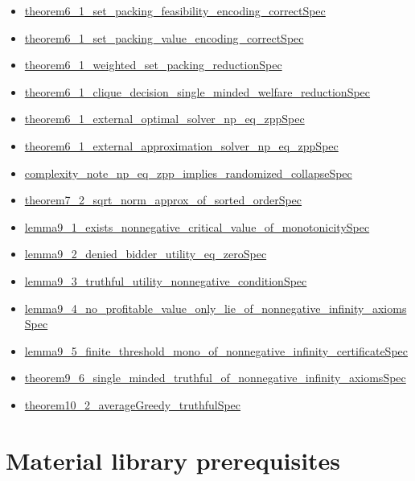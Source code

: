 \documentclass[10pt]{article}
\begin{document}
\begin{itemize}[leftmargin=1.2em]
\begin{itemize}[leftmargin=1.2em]
\item \hyperlink{source-claim-86646cd0d0215b44}{theorem6\_1\_set\_packing\_feasibility\_encoding\_correctSpec}
\item \hyperlink{source-claim-d0d92dc8489e3ec0}{theorem6\_1\_set\_packing\_value\_encoding\_correctSpec}
\item \hyperlink{source-claim-ff0c3f9034b08961}{theorem6\_1\_weighted\_set\_packing\_reductionSpec}
\item \hyperlink{source-claim-36aed816d8ba695f}{theorem6\_1\_clique\_decision\_single\_minded\_welfare\_reductionSpec}
\item \hyperlink{source-claim-6020eb38d0e63438}{theorem6\_1\_external\_optimal\_solver\_np\_eq\_zppSpec}
\item \hyperlink{source-claim-663dfd5b5c9e0312}{theorem6\_1\_external\_approximation\_solver\_np\_eq\_zppSpec}
\item \hyperlink{source-claim-9e8344eee2eaa4e1}{complexity\_note\_np\_eq\_zpp\_implies\_randomized\_collapseSpec}
\item \hyperlink{source-claim-b46d7e115e9a3120}{theorem7\_2\_sqrt\_norm\_approx\_of\_sorted\_orderSpec}
\item \hyperlink{source-claim-ee3b560e8675a1c5}{lemma9\_1\_exists\_nonnegative\_critical\_value\_of\_monotonicitySpec}
\item \hyperlink{source-claim-4ca1501deb404166}{lemma9\_2\_denied\_bidder\_utility\_eq\_zeroSpec}
\item \hyperlink{source-claim-46c3e23a7fdc534c}{lemma9\_3\_truthful\_utility\_nonnegative\_conditionSpec}
\item \hyperlink{source-claim-ea97aef832b046f9}{lemma9\_4\_no\_profitable\_value\_only\_lie\_of\_nonnegative\_infinity\_axiomsSpec}
\item \hyperlink{source-claim-2070fa93b4f6ae62}{lemma9\_5\_finite\_threshold\_mono\_of\_nonnegative\_infinity\_certificateSpec}
\item \hyperlink{source-claim-182799567034cff6}{theorem9\_6\_single\_minded\_truthful\_of\_nonnegative\_infinity\_axiomsSpec}
\item \hyperlink{source-claim-4a20770856e8ccb4}{theorem10\_2\_averageGreedy\_truthfulSpec}
\end{itemize}
\end{itemize}

\clearpage
\hypertarget{library-section-982ca190539c045c}{}
\section*{Material library prerequisites}
\hypertarget{library-prerequisite-3240074e96589b21}{}
\end{document}
